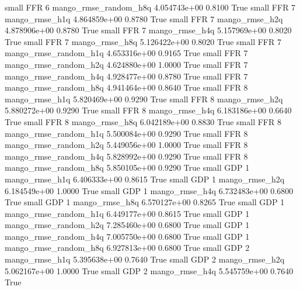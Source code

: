      small      FFR                 6 mango_rmse_random_h8q 4.054743e+00      0.8100    True
     small      FFR                 7        mango_rmse_h1q 4.864859e+00      0.8780    True
     small      FFR                 7        mango_rmse_h2q 4.878906e+00      0.8780    True
     small      FFR                 7        mango_rmse_h4q 5.157969e+00      0.8020    True
     small      FFR                 7        mango_rmse_h8q 5.126422e+00      0.8020    True
     small      FFR                 7 mango_rmse_random_h1q 4.653316e+00      0.9165    True
     small      FFR                 7 mango_rmse_random_h2q 4.624880e+00      1.0000    True
     small      FFR                 7 mango_rmse_random_h4q 4.928477e+00      0.8780    True
     small      FFR                 7 mango_rmse_random_h8q 4.941464e+00      0.8640    True
     small      FFR                 8        mango_rmse_h1q 5.820469e+00      0.9290    True
     small      FFR                 8        mango_rmse_h2q 5.880272e+00      0.9290    True
     small      FFR                 8        mango_rmse_h4q 6.183186e+00      0.6640    True
     small      FFR                 8        mango_rmse_h8q 6.042189e+00      0.8830    True
     small      FFR                 8 mango_rmse_random_h1q 5.500084e+00      0.9290    True
     small      FFR                 8 mango_rmse_random_h2q 5.449056e+00      1.0000    True
     small      FFR                 8 mango_rmse_random_h4q 5.828992e+00      0.9290    True
     small      FFR                 8 mango_rmse_random_h8q 5.850105e+00      0.9290    True
     small      GDP                 1        mango_rmse_h1q 6.406333e+00      0.8615    True
     small      GDP                 1        mango_rmse_h2q 6.184549e+00      1.0000    True
     small      GDP                 1        mango_rmse_h4q 6.732483e+00      0.6800    True
     small      GDP                 1        mango_rmse_h8q 6.570127e+00      0.8265    True
     small      GDP                 1 mango_rmse_random_h1q 6.449177e+00      0.8615    True
     small      GDP                 1 mango_rmse_random_h2q 7.285460e+00      0.6800    True
     small      GDP                 1 mango_rmse_random_h4q 7.005750e+00      0.6800    True
     small      GDP                 1 mango_rmse_random_h8q 6.927813e+00      0.6800    True
     small      GDP                 2        mango_rmse_h1q 5.395638e+00      0.7640    True
     small      GDP                 2        mango_rmse_h2q 5.062167e+00      1.0000    True
     small      GDP                 2        mango_rmse_h4q 5.545759e+00      0.7640    True
